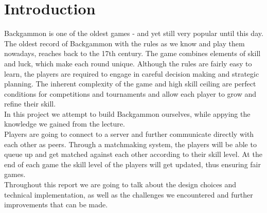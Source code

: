 \documentclass[ twoside,openright,titlepage,numbers=noenddot,headinclude,%
                footinclude=true,cleardoublepage=empty,abstractoff, %
                BCOR=5mm,paper=a4,fontsize=11pt,%
                ngerman,american,%
                ]{scrreprt}
\begin{document}
\frenchspacing
\raggedbottom
{} %
\pagestyle{plain}



\pagestyle{scrheadings}
\cleardoublepage
\cleardoublepage{}
\cleardoublepage


\chapter{Introduction}
\label{cha:introduction}
Backgammon is one of the oldest games - and yet still very popular until this day. The oldest record of Backgammon with the rules as we know and play them nowadays, reaches back to the 17th century. 
The game combines elements of skill and luck, which make each round unique. Although the rules are fairly easy to learn, the players are required to engage in careful decision making and strategic planning.
The inherent complexity of the game and high skill ceiling are perfect conditions for competitions and tournaments and allow each player to grow and refine their skill. \\
In this project we attempt to build Backgammon ourselves, while appying the knowledge we gained from the lecture. \\
Players are going to connect to a server and further communicate directly with each other as peers. %
Through a matchmaking system, the players will be able to queue up and get matched against each other according to their skill level. 
At the end of each game the skill level of the players will get updated, thus ensuring fair games.\\
Throughout this report we are going to talk about the design choices and technical implementation, as well as the challenges we encountered and further improvements that can be made. 
\end{document}
